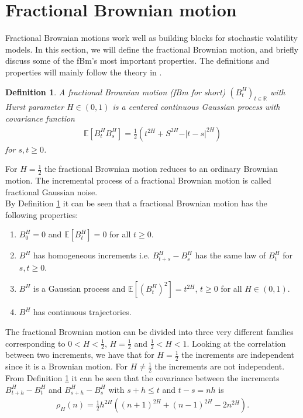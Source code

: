 \documentclass{article}
\newtheorem{definition}{Definition}
\begin{document}
\section{Fractional Brownian motion} \label{sec:fbm}
Fractional Brownian motions work well as building blocks for stochastic volatility models. In this section, we will define the fractional Brownian motion, and briefly discuss some of the fBm's most important properties. The definitions and properties will mainly follow the theory in \cite{biagini2008}.\\
\begin{definition}
A fractional Brownian motion (fBm for short) $(B_t^H)_{t\in\mathbb{R}}$ with Hurst parameter $H\in(0,1)$ is a centered continuous Gaussian process with covariance function
\begin{align}
\mathbb{E}\left[B_t^HB_s^H\right] = \frac{1}{2}\left(t^{2H}+S^{2H}-\vert t-s\vert ^{2H} \right) \label{eq:fbm}
\end{align} \label{def:fbm}
for $s,t\geq0$.
\end{definition}
For $H = \frac{1}{2}$ the fractional Brownian motion reduces to an ordinary Brownian motion. The incremental process of a fractional Brownian motion is called fractional Gaussian noise.\\
By Definition \ref{def:fbm} it can be seen that a fractional Brownian motion has the following properties:
\begin{enumerate}
    \item $B_0^H = 0$ and $\mathbb{E}[B^H_t] = 0$ for all $t\geq 0$.
    \item $B^H$ has homogeneous increments i.e. $B^H_{t+s}-B^H_s$ has the same law of $B^H_t$ for $s,t\geq0$.
    \item $B^H$ is a Gaussian process and $\mathbb{E}[(B^H_t)^2]=t^{2H}$, $t\geq 0$ for all $H\in (0,1)$.
    \item $B^H$ has continuous trajectories.
\end{enumerate}
The fractional Brownian motion can be divided into three very different families corresponding to $0<H<\frac{1}{2}$, $H=\frac{1}{2}$ and $\frac{1}{2}<H<1$. Looking at the correlation between two increments, we have that for $H=\frac{1}{2}$ the increments are independent since it is a Brownian motion. For $H\neq \frac{1}{2}$ the increments are not independent. From Definition \ref{def:fbm} it can be seen that the covariance between the increments $B^H_{t+h}-B^H_{t}$ and $B^H_{s+h}-B^H_{s}$ with $s+h\leq t$ and $t-s=nh$ is
\begin{align*}
\rho_H(n) = \frac{1}{2}h^{2H} \left( (n+1)^{2H} +(n-1)^{2H} -2n^{2H}\right).
\end{align*}
\end{document}
